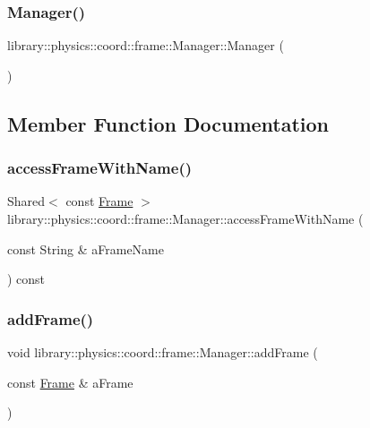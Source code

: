 \subsubsection{\texorpdfstring{Manager()}{Manager()}}
{\footnotesize\ttfamily library\+::physics\+::coord\+::frame\+::\+Manager\+::\+Manager (\begin{DoxyParamCaption}{ }\end{DoxyParamCaption})}



\subsection{Member Function Documentation}
\mbox{\label{classlibrary_1_1physics_1_1coord_1_1frame_1_1_manager_a13b4885965a111cebff6f04339d81596}} 
\subsubsection{\texorpdfstring{access\+Frame\+With\+Name()}{accessFrameWithName()}}
{\footnotesize\ttfamily Shared$<$ const \hyperlink{classlibrary_1_1physics_1_1coord_1_1_frame}{Frame} $>$ library\+::physics\+::coord\+::frame\+::\+Manager\+::access\+Frame\+With\+Name (\begin{DoxyParamCaption}\item[{const String \&}]{a\+Frame\+Name }\end{DoxyParamCaption}) const}

\mbox{\label{classlibrary_1_1physics_1_1coord_1_1frame_1_1_manager_aa4215eb9b956a3b4a2933a33d98b7007}} 
\subsubsection{\texorpdfstring{add\+Frame()}{addFrame()}}
{\footnotesize\ttfamily void library\+::physics\+::coord\+::frame\+::\+Manager\+::add\+Frame (\begin{DoxyParamCaption}\item[{const \hyperlink{classlibrary_1_1physics_1_1coord_1_1_frame}{Frame} \&}]{a\+Frame }\end{DoxyParamCaption})}

